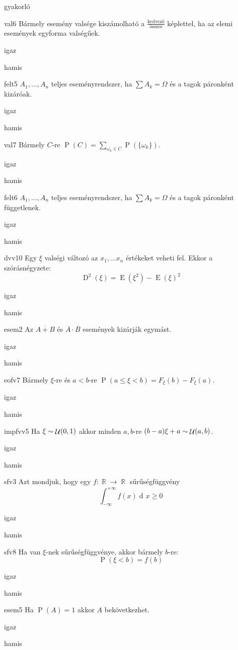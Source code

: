 \documentclass[12pt]{article}
\DeclareMathOperator{\E}{E}
\DeclareMathOperator{\D}{D}
\renewcommand{\P}{\operatorname{P}}
\renewcommand{\d}{\operatorname{d\! }} %
\DeclareMathOperator{\R}{\mathbb{R}}
\DeclareMathOperator{\Unif}{{\cal U}}
\begin{document}
\begin{quiz}{gyakorló}
\begin{multi}{val6}
Bármely esemény valsége kiszámolható a $\frac{\text{kedvező}}{\text{összes}}$ képlettel, ha az elemi események 
egyforma valségűek.
\item* igaz
\item hamis
\end{multi}
\begin{multi}{felt5}
$A_1,\ldots,A_n$ teljes eseményrendszer, ha $\sum A_k=\Omega$ és a tagok páronként kizáróak.
\item* igaz
\item hamis
\end{multi}
\begin{multi}{val7}
Bármely $C$-re $\P(C)=\sum_{\omega_k\in C} \P( \{\omega_k \})$.
\item* igaz
\item hamis
\end{multi}
\begin{multi}{felt6}
$A_1,\ldots,A_n$ teljes eseményrendszer, ha $\sum A_k=\Omega$ és a tagok páronként függetlenek.
\item igaz
\item* hamis
\end{multi}
\begin{multi}{dvv10}
Egy $\xi$ valségi változó az $x_1,\ldots x_n$ értékeket veheti fel. 
Ekkor a szórásnégyzete:
$$
\D^2(\xi)=\E(\xi^2)-\E(\xi)^2
$$
\item* igaz
\item hamis
\end{multi}
\begin{multi}{esem2}
Az $\overline{A+B}$ és $\overline{A} \cdot \overline{B}$ események kizárják egymást.
\item igaz
\item* hamis
\end{multi}
\begin{multi}{eofv7}
Bármely $\xi$-re és $a<b$-re $\P(a\le \xi <b)=F_{\xi}(b)-F_{\xi}(a)$.
\item* igaz
\item hamis
\end{multi}
\begin{multi}{impfvv5}
Ha $\xi\sim \Unif(0,1)$ akkor minden $a,b$-re $(b-a)\xi+a\sim \Unif(a,b)$.
\item* igaz
\item hamis
\end{multi}
\begin{multi}{sfv3}
Azt mondjuk, hogy egy $f:\R\to \R$ sűrűségfüggvény 
$$
\int_{-\infty}^{+\infty}f(x)\d x\ge 0
$$
\item igaz
\item* hamis
\end{multi}
\begin{multi}{sfv8}
Ha van $\xi$-nek sűrűségfüggvénye, akkor bármely $b$-re:
$$
\P(\xi<b)=f(b)
$$
\item igaz
\item* hamis
\end{multi}
\begin{multi}{esem5}
Ha $\P(A)=1$ akkor $A$ bekövetkezhet.
\item* igaz
\item hamis
\end{multi}
\end{quiz}
\end{document}
